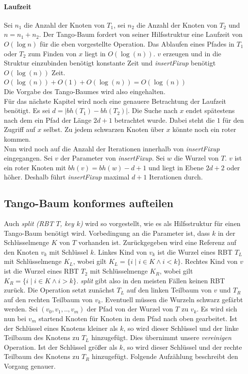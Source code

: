 \documentclass[a4paper,12pt]{article}
\begin{document}
\paragraph{Laufzeit}
Sei $n_1$ die Anzahl der Knoten von $T_1$, sei $n_2$ die Anzahl der Knoten von $T_2$ und $n = n_1 + n_2$. Der Tango-Baum fordert von seiner Hilfsstruktur eine Laufzeit von $O(\log n)$ für die eben vorgestellte Operation.  Das Ablaufen eines Pfades in $T_1$ oder $T_2$ zum Finden von $x$ liegt in $O(\log (n))$. $v$ erzeugen und in die Struktur einzubinden benötigt konstante Zeit und \textit{insertFixup} benötigt  $O(\log (n))$ Zeit.\\
$O(\log (n)) + O(1) +O(\log (n)) = O(\log (n
))$\\
Die Vorgabe des Tango-Baumes wird also eingehalten.\\
Für das nächste Kapitel wird noch eine genauere Betrachtung der Laufzeit benötigt. Es sei $d = \vert \mathit{bh}(T_1) - \mathit{bh}(T_2)  \vert $. Die Suche nach $x$ endet spätestens nach dem ein Pfad der Länge $2d + 1$ betrachtet wurde. Dabei steht die $1$ für den Zugriff auf $x$ selbst. Zu jedem schwarzen Knoten über $x$ könnte noch ein roter kommen.\\
Nun wird noch auf die Anzahl der Iterationen innerhalb von \textit{insertFixup} eingegangen. Sei $v$ der Parameter von \textit{insertFixup}. Sei $w$ die Wurzel von $T$. $v$ ist ein roter Knoten mit $\mathit{bh}(v) = \mathit{bh}(w) - d + 1$ und liegt in Ebene $2d + 2$ oder höher. Deshalb führt \textit{insertFixup} maximal $d + 1$ Iterationen durch.  

\subsection{Tango-Baum konformes aufteilen}
Auch \textit{split (RBT $T$, key $k$)} wird so vorgestellt, wie es als Hilfsstruktur für einen Tango-Baum benötigt wird. Vorbedingung an die Parameter ist, dass $k$ in der Schlüsselmenge $K$ von $T$ vorhanden ist. Zurückgegeben wird eine Referenz auf den Knoten $v_k$ mit Schlüssel $k$. Linkes Kind von $v_k$ ist die Wurzel eines RBT $T_L$ mit Schlüsselmenge $K_L$, wobei gilt ${K_L=\{i \mid  i\in K \land i <k\}}$. Rechtes Kind von $v$ ist die Wurzel eines RBT $T_2$ mit Schlüsselmenge $K_R$, wobei gilt ${K_R = \{i \mid i\in K \land i > k\}}$. \textit{split} gibt also in den meisten Fällen keinen RBT zurück. Die Operation setzt zunächst $T_L$ auf den linken Teilbaum von $v$ und $T_R$ auf den rechten Teilbaum von $v_k$. Eventuell müssen die Wurzeln schwarz gefärbt werden. Sei $(v_0,v_1,..,v_m)$  der Pfad von der Wurzel von $T$ zu $v_k$. Es wird sich nun bei $v_m$ startend Knoten für Knoten in dem Pfad nach oben gearbeitet. Ist der Schlüssel eines Knotens kleiner als $k$, so wird dieser Schlüssel und der linke Teilbaum des Knotens zu $T_L$ hinzugefügt. Dies übernimmt unsere \textit{vereinigen} Operation. Ist der Schlüssel größer als $k$, so wird dieser Schlüssel und der rechte Teilbaum des Knotens zu $T_R$ hinzugefügt. Folgende Aufzählung beschreibt den Vorgang genauer.
\end{document}
